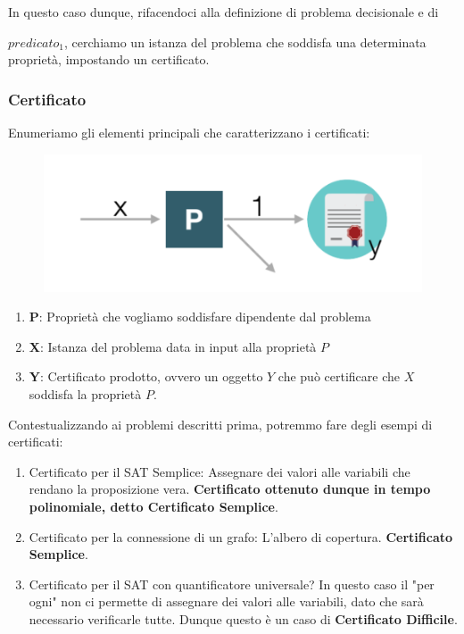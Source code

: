 \documentclass{article}
\begin{document}
\vskip 1cm

In questo caso dunque, rifacendoci alla definizione di problema decisionale e di 

$predicato_{1}$, cerchiamo un istanza del problema che soddisfa una determinata proprietà, impostando un certificato.

\newpage

\subsubsection{Certificato}

Enumeriamo gli elementi principali che caratterizzano i certificati:

\begin{figure}[htbp]
    \center
    \includegraphics[scale=0.5]{img/certificato.png}
\end{figure}

\begin{enumerate}
    \item \textbf{P}: Proprietà che vogliamo soddisfare dipendente dal problema
    \item \textbf{X}: Istanza del problema data in input alla proprietà $P$
    \item \textbf{Y}: Certificato prodotto, ovvero un oggetto $Y$ che può certificare che $X$ soddisfa la proprietà $P$.
\end{enumerate}

Contestualizzando ai problemi descritti prima, potremmo fare degli esempi di certificati:

\begin{enumerate}
    \item Certificato per il SAT Semplice: Assegnare dei valori alle variabili che rendano la proposizione vera. \textbf{Certificato ottenuto dunque in tempo polinomiale, detto Certificato Semplice}.
    \item Certificato per la connessione di un grafo: L'albero di copertura. \textbf{Certificato Semplice}.
    \item Certificato per il SAT con quantificatore universale? In questo caso il "per ogni" non ci permette di assegnare dei valori alle variabili, dato che sarà necessario verificarle tutte. Dunque questo è un caso di \textbf{Certificato Difficile}.
\end{enumerate}
\end{document}
